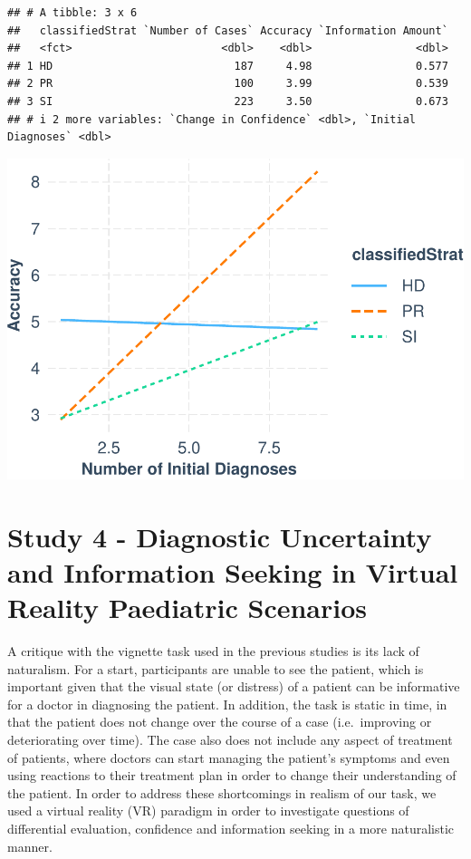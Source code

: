 \documentclass[a4paper, nobind]{templates/ociamthesis}
\begin{document}
\begin{verbatim}
## # A tibble: 3 x 6
##   classifiedStrat `Number of Cases` Accuracy `Information Amount`
##   <fct>                       <dbl>    <dbl>                <dbl>
## 1 HD                            187     4.98                0.577
## 2 PR                            100     3.99                0.539
## 3 SI                            223     3.50                0.673
## # i 2 more variables: `Change in Confidence` <dbl>, `Initial Diagnoses` <dbl>
\end{verbatim}

\includegraphics{_main_files/figure-latex/stratInteractionModel-1.pdf}

\chapter*{Study 4 - Diagnostic Uncertainty and Information Seeking in Virtual Reality Paediatric Scenarios}\label{study-4---diagnostic-uncertainty-and-information-seeking-in-virtual-reality-paediatric-scenarios}

\adjustmtc
{}

A critique with the vignette task used in the previous studies is its lack of naturalism. For a start, participants are unable to see the patient, which is important given that the visual state (or distress) of a patient can be informative for a doctor in diagnosing the patient. In addition, the task is static in time, in that the patient does not change over the course of a case (i.e.~improving or deteriorating over time). The case also does not include any aspect of treatment of patients, where doctors can start managing the patient's symptoms and even using reactions to their treatment plan in order to change their understanding of the patient. In order to address these shortcomings in realism of our task, we used a virtual reality (VR) paradigm in order to investigate questions of differential evaluation, confidence and information seeking in a more naturalistic manner.
\end{document}
